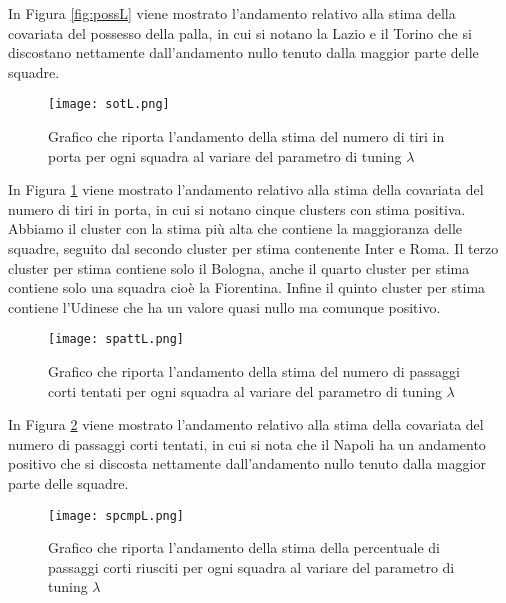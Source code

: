 In Figura \ref{fig:possL} viene mostrato l'andamento relativo alla stima della covariata del possesso della palla, in cui si notano la Lazio e il Torino che si discostano nettamente dall'andamento nullo tenuto dalla maggior parte delle squadre.

\begin{figure}[htbp]
	\begin{center}
		\texttt{[image: sotL.png]}
		\caption{Grafico che riporta l'andamento della stima del numero di tiri in porta per ogni squadra al variare del parametro di tuning $\lambda$} \label{fig:sotL}
	\end{center}
\end{figure}

In Figura \ref{fig:sotL} viene mostrato l'andamento relativo alla stima della covariata del numero di tiri in porta, in cui si notano cinque clusters con stima positiva. Abbiamo il cluster con la stima più alta che contiene la maggioranza delle squadre, seguito dal secondo cluster per stima contenente Inter e Roma. Il terzo cluster per stima contiene solo il Bologna, anche il quarto cluster per stima contiene solo una squadra cioè la Fiorentina. Infine il quinto cluster per stima contiene l'Udinese che ha un valore quasi nullo ma comunque positivo.

\begin{figure}[htbp]
	\begin{center}
		\texttt{[image: spattL.png]}
		\caption{Grafico che riporta l'andamento della stima del numero di passaggi corti tentati per ogni squadra al variare del parametro di tuning $\lambda$} \label{fig:spattL}
	\end{center}
\end{figure}

In Figura \ref{fig:spattL} viene mostrato l'andamento relativo alla stima della covariata del numero di passaggi corti tentati, in cui si nota che il Napoli ha un andamento positivo che si discosta nettamente dall'andamento nullo tenuto dalla maggior parte delle squadre.

\begin{figure}[htbp]
	\begin{center}
		\texttt{[image: spcmpL.png]}
		\caption{Grafico che riporta l'andamento della stima della percentuale di passaggi corti riusciti per ogni squadra al variare del parametro di tuning $\lambda$} \label{fig:spcmpL}
	\end{center}
\end{figure}

